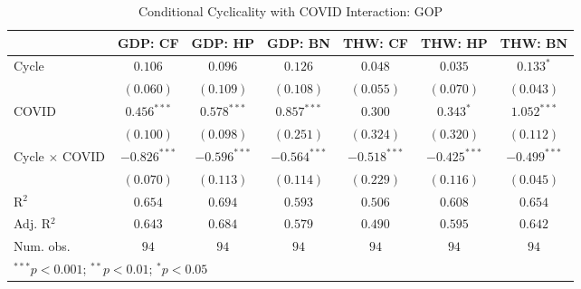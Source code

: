 
\usepackage{booktabs}

\begin{table}
\begin{center}
\begin{tabular}{l c c c c c c}
\toprule
 & GDP: CF & GDP: HP & GDP: BN & THW: CF & THW: HP & THW: BN \\
\midrule
Cycle                & $0.106$        & $0.096$        & $0.126$        & $0.048$        & $0.035$        & $0.133^{*}$    \\
                     & $(0.060)$      & $(0.109)$      & $(0.108)$      & $(0.055)$      & $(0.070)$      & $(0.043)$      \\
COVID                & $0.456^{***}$  & $0.578^{***}$  & $0.857^{***}$  & $0.300$        & $0.343^{*}$    & $1.052^{***}$  \\
                     & $(0.100)$      & $(0.098)$      & $(0.251)$      & $(0.324)$      & $(0.320)$      & $(0.112)$      \\
Cycle $\times$ COVID & $-0.826^{***}$ & $-0.596^{***}$ & $-0.564^{***}$ & $-0.518^{***}$ & $-0.425^{***}$ & $-0.499^{***}$ \\
                     & $(0.070)$      & $(0.113)$      & $(0.114)$      & $(0.229)$      & $(0.116)$      & $(0.045)$      \\
\midrule
R$^2$                & $0.654$        & $0.694$        & $0.593$        & $0.506$        & $0.608$        & $0.654$        \\
Adj. R$^2$           & $0.643$        & $0.684$        & $0.579$        & $0.490$        & $0.595$        & $0.642$        \\
Num. obs.            & $94$           & $94$           & $94$           & $94$           & $94$           & $94$           \\
\bottomrule
\multicolumn{7}{l}{\scriptsize{$^{***}p<0.001$; $^{**}p<0.01$; $^{*}p<0.05$}}
\end{tabular}
\caption{Conditional Cyclicality with COVID Interaction: GOP}
\label{tab:gop_covid}
\end{center}
\end{table}
